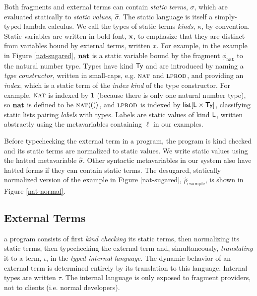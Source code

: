 \documentclass[10pt,preprint]{sigplanconf}
\begin{document}
{Both fragments and external terms can contain \emph{static terms}, $\sigma$, which are evaluated statically to \emph{static values}, $\hat\sigma$. The static language is itself a simply-typed lambda calculus. We call the types of static terms \emph{kinds}, $\kappa$, by convention. Static variables are written in bold font, ${\textbf{x}}$, to emphasize that they are distinct from variables bound by external terms, written $x$. For example, in the example in Figure \ref{nat-sugared}, ${\textbf{nat}}$ is a static variable bound by the fragment $\phi_{\texttt{nat}}$ to the natural number type. Types have kind $\textsf{Ty}$ and are introduced by naming a \emph{type constructor}, written in small-caps, e.g. $\textsc{nat}$ and $\textsc{lprod}$, and providing an \emph{index}, which is a static term of the \emph{index kind} of the type constructor.  For example, $\textsc{nat}$ is indexed by $\textsf{1}$ (because there is only one natural number type), so ${\textbf{nat}}$ is defined to be $\textsc{nat}\langle()\rangle$, and $\textsc{lprod}$ is indexed by $\textsf{list}[{\sf L} \times \textsf{Ty}]$, classifying static lists pairing \emph{labels} with types. Labels are static values of kind ${\sf L}$, written abstractly using the metavariables containing $\ell$ in our examples. 

Before typechecking the external term in a program, the program is kind checked and its static terms are normalized to static values.  We write static values using the hatted metavariable $\hat \sigma$. Other syntactic metavariables in our system also have hatted forms if they can contain static terms. The desugared, statically normalized version of the example in Figure \ref{nat-sugared}, $\hat\rho_{\text{example}}$, is shown in Figure \ref{nat-normal}. %

\subsection{External Terms}
 a program consists of first \emph{kind checking} its static terms, then normalizing its static terms, then typechecking the external term and,  simultaneously, \emph{translating} it to a term, $\iota$, in the \emph{typed internal language}. The dynamic behavior of an external term is determined entirely by its translation to this language. Internal types are written $\tau$. The internal language is only exposed to fragment providers, not to clients (i.e. normal developers).


}
\end{document}
